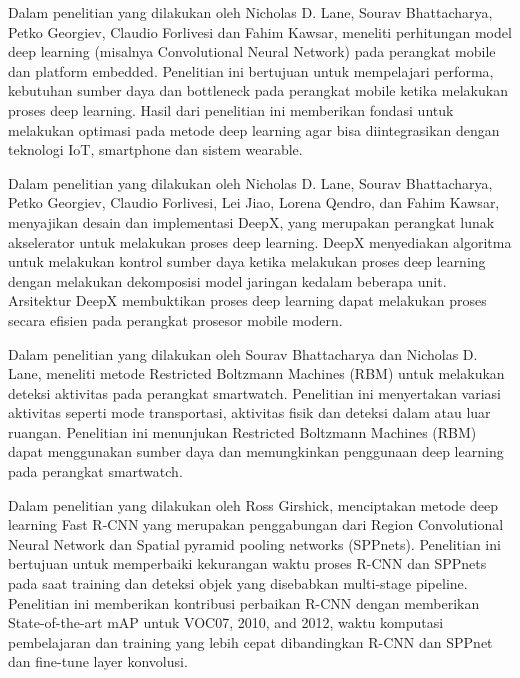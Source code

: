 Dalam penelitian \cite{early_Resource} yang dilakukan oleh Nicholas D. Lane, Sourav Bhattacharya, Petko Georgiev, Claudio Forlivesi dan Fahim Kawsar, meneliti perhitungan model deep learning (misalnya Convolutional Neural Network) pada perangkat mobile dan platform embedded. Penelitian ini bertujuan untuk mempelajari performa, kebutuhan sumber daya dan bottleneck pada perangkat mobile ketika melakukan proses deep learning. Hasil dari penelitian ini memberikan fondasi untuk melakukan optimasi pada metode deep learning agar bisa diintegrasikan dengan teknologi IoT, smartphone dan sistem wearable.

Dalam penelitian \cite{deepx} yang dilakukan oleh Nicholas D. Lane, Sourav Bhattacharya, Petko Georgiev, Claudio Forlivesi, Lei Jiao, Lorena Qendro, dan Fahim Kawsar, menyajikan desain dan implementasi DeepX, yang merupakan perangkat lunak akselerator untuk melakukan proses deep learning. DeepX menyediakan algoritma untuk melakukan kontrol sumber daya ketika melakukan proses deep learning dengan melakukan dekomposisi model jaringan kedalam beberapa unit. Arsitektur DeepX membuktikan proses deep learning dapat melakukan proses secara efisien pada perangkat prosesor mobile modern.

Dalam penelitian \cite{smart_to_deep} yang dilakukan oleh Sourav Bhattacharya dan Nicholas D. Lane, meneliti metode Restricted Boltzmann Machines (RBM) untuk melakukan deteksi aktivitas pada perangkat smartwatch. Penelitian ini menyertakan variasi aktivitas seperti mode transportasi, aktivitas fisik dan deteksi dalam atau luar ruangan. Penelitian ini menunjukan Restricted Boltzmann Machines (RBM) dapat menggunakan sumber daya dan memungkinkan penggunaan deep learning pada perangkat smartwatch.

Dalam penelitian \cite{fast_rcnn} yang dilakukan oleh Ross Girshick, menciptakan metode deep learning Fast R-CNN yang merupakan penggabungan dari Region Convolutional Neural Network dan Spatial pyramid pooling networks (SPPnets). Penelitian ini bertujuan untuk memperbaiki kekurangan waktu proses R-CNN dan SPPnets pada saat training dan deteksi objek yang disebabkan multi-stage pipeline. Penelitian ini memberikan kontribusi perbaikan R-CNN dengan memberikan State-of-the-art mAP untuk VOC07, 2010, and 2012, waktu komputasi pembelajaran dan training yang lebih cepat dibandingkan R-CNN dan SPPnet dan fine-tune layer konvolusi.

